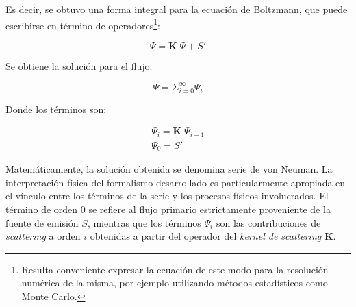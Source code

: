 Es decir, se obtuvo una forma integral para la ecuaci\'on de Boltzmann, que puede escribirse en t\'ermino de operadores\footnote{Resulta conveniente
expresar la ecuaci\'on de este modo para la resoluci\'on num\'erica de la misma, por ejemplo utilizando m\'etodos estad\'isticos como Monte Carlo.}:


\begin{equation}
 	\Psi = \mathbf{K} \; \Psi + S'
 \label{EqXVI} 
\end{equation}

Se obtiene la soluci\'on para el flujo:

\begin{equation}
 	\Psi = \Sigma _{i=0} ^{\infty} \Psi_{i}
 \label{EqXVII} 
\end{equation}

Donde los t\'erminos son:

\begin{eqnarray}
 	\Psi_{i} = \mathbf{K} \; \Psi_{i-1} \nonumber \\
 	\Psi_{0} = S'
 \label{EqXVIII} 
\end{eqnarray}

Matem\'aticamente, la soluci\'on obtenida se denomina serie de von Neuman. La interpretaci\'on f\'isica del formalismo desarrollado es particularmente
apropiada en el v\'inculo entre los t\'erminos de la serie y los procesos f\'isicos involucrados. El t\'ermino de orden 0 se refiere al flujo primario
estrictamente proveniente de la fuente de emisi\'on $S$, mientras que los t\'erminos $\Psi_{i}$ son las contribuciones de \textit{scattering} a orden $i$
obtenidas a partir del operador del \textit{kernel de scattering} $\mathbf{K}$.